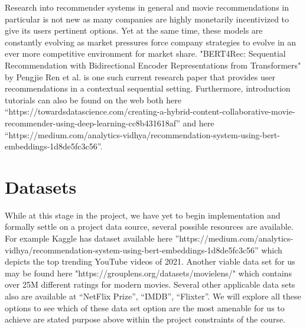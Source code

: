 \documentclass[10pt,twocolumn,letterpaper]{article}
\begin{document}
Research into recommender systems in general and movie recommendations in particular is not new as many companies are highly monetarily incentivized to give its users pertinent options.  Yet at the same time, these models are constantly evolving as market pressures force company strategies to evolve in an ever more competitive environment for market share. "BERT4Rec: Sequential Recommendation with Bidirectional Encoder Representations from Transformers" by Pengjie Ren et al. is one such current research paper that provides user recommendations in a contextual sequential setting.  Furthermore, introduction tutorials can also be found on the web both here “https://towardsdatascience.com/creating-a-hybrid-content-collaborative-movie-recommender-using-deep-learning-cc8b431618af” and here “https://medium.com/analytics-vidhya/recommendation-system-using-bert-embeddings-1d8de5fc3c56”.


\section{Datasets}

While at this stage in the project, we have yet to begin implementation and formally settle on a project data source, several possible resources are available.  For example Kaggle has dataset available here ”https://medium.com/analytics-vidhya/recommendation-system-using-bert-embeddings-1d8de5fc3c56” which depicts the top trending YouTube videos of 2021.  Another viable data set for us may be found here "https://grouplens.org/datasets/movielens/" which contains over 25M different ratings for modern movies.  Several other applicable data sets also are available at “NetFlix Prize”, “IMDB”, “Flixter”.  We will explore all these options to see which of these data set option are the most amenable for us to achieve are stated purpose above within the project constraints of the course.
\end{document}
